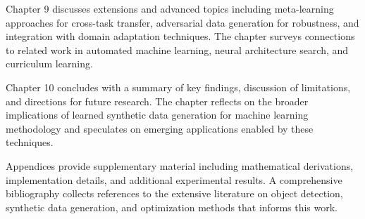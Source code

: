 Chapter 9 discusses extensions and advanced topics including meta-learning approaches for cross-task transfer, adversarial data generation for robustness, and integration with domain adaptation techniques. The chapter surveys connections to related work in automated machine learning, neural architecture search, and curriculum learning.

Chapter 10 concludes with a summary of key findings, discussion of limitations, and directions for future research. The chapter reflects on the broader implications of learned synthetic data generation for machine learning methodology and speculates on emerging applications enabled by these techniques.

Appendices provide supplementary material including mathematical derivations, implementation details, and additional experimental results. A comprehensive bibliography collects references to the extensive literature on object detection, synthetic data generation, and optimization methods that informs this work.


